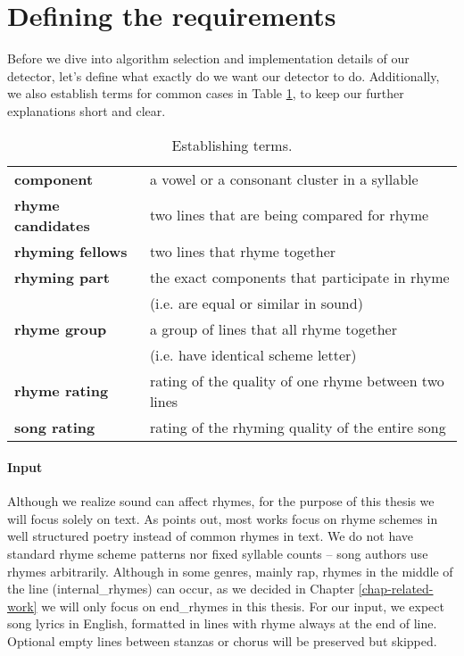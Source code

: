 \section{Defining the requirements}\label{defining_the_requirements}
Before we dive into algorithm selection and implementation details of our detector, let's define what exactly do we want our detector to do. Additionally, we also establish terms for common cases in Table \ref{terms}, to keep our further explanations short and clear.
\begin{table}[h!]
	\centering
	\begin{tabular}{>{\bfseries}l l} 
		component & a vowel or a consonant cluster in a syllable\\
		rhyme candidates & two lines that are being compared for rhyme \\
		rhyming fellows & two lines that rhyme together\\
		rhyming part & the exact components that participate in rhyme \\&(i.e. are equal or similar in sound)\\
		rhyme group & a group of lines that all rhyme together\\& (i.e. have identical scheme letter) \\
		rhyme rating & rating of the quality of one rhyme between two lines\\
		song rating & rating of the rhyming quality of the entire song\\
	\end{tabular}
	\caption{Establishing terms.}
	\label{terms}
\end{table}

\paragraph{Input}
Although we realize sound can affect rhymes, for the purpose of this thesis we will focus solely on text. As \cite{rhymes_overview} points out, most works focus on rhyme schemes in well structured poetry instead of common rhymes in text. We do not have standard rhyme scheme patterns nor fixed syllable counts -- song authors use rhymes arbitrarily. Although in some genres, mainly rap, rhymes in the middle of the line (\gls{internal_rhyme}s) can occur, as we decided in Chapter \ref{chap-related-work} we will only focus on \gls{end_rhyme}s in this thesis. For our input, we expect song lyrics in English, formatted in lines with rhyme always at the end of line. Optional empty lines between stanzas or chorus will be preserved but skipped.

